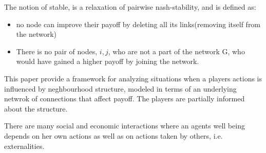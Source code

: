 The notion of stable, is a relaxation of pairwise nash-stability, and is defined as:
\begin{itemize}
\item no node can improve their payoff by deleting all its links(removing itself from the network)
\item There is no pair of nodes, $i,j$, who are not a part of the network G, who would have gained a higher payoff by joining the network.
\end{itemize}

This paper\cite{networkgames}  provide a framework for analyzing situations when a players actions is influenced by neghbourhood structure, modeled in terms of an underlying netwrok of connections that affect payoff.
The players are partially informed about the structure. 

There are many social and economic interactions where an agents well being depends on her own actions as well as on actions taken by others, i.e. externalities. 


